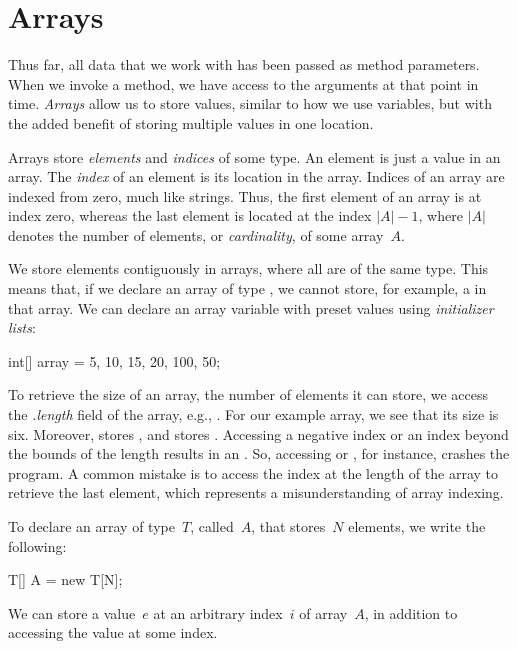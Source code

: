 \section{Arrays}

Thus far, all data that we work with has been passed as method parameters. 
When we invoke a method, we have access to the arguments at that point in time. 
\emph{Arrays} allow us to store values, similar to how we use variables, but with the added benefit of storing multiple values in one location.

Arrays store \emph{elements} and \emph{indices} of some type. 
An element is just a value in an array. 
The \emph{index} of an element is its location in the array. 
Indices of an array are indexed from zero, much like strings. 
Thus, the first element of an array is at index zero, whereas the last element is located at the index $|A| - 1$, where $|A|$ denotes the number of elements, or \emph{cardinality}, of some array~$A$.

We store elements contiguously in arrays, where all are of the same type. 
This means that, if we declare an array of type , we cannot store, for example, a  in that array. 
We can declare an array variable with preset values using \emph{initializer lists}:

\begin{verbnobox}[\small]
int[] array = {5, 10, 15, 20, 100, 50};
\end{verbnobox}

To retrieve the size of an array, the number of elements it can store, we access the \emph{.length} field of the array, e.g., . 
For our example array, we see that its size is six. 
Moreover,  stores , and  stores . 
Accessing a negative index or an index beyond the bounds of the length results in an . 
So, accessing  or , for instance, crashes the program. 
A common mistake is to access the index at the length of the array to retrieve the last element, which represents a misunderstanding of array indexing.

To declare an array of type~$T$, called~$A$, that stores~$N$ elements, we write the following:

\begin{verbnobox}[\small]
T[] A = new T[N];
\end{verbnobox}

We can store a value~$e$ at an arbitrary index~$i$ of array~$A$, in addition to accessing the value at some index.


